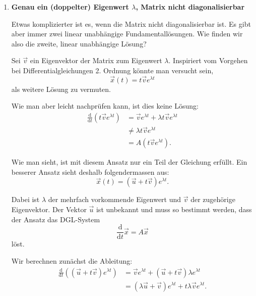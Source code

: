 \begin{enumerate}
\begin{enumerate}
              \item \textbf{Genau ein (doppelter) Eigenwert \(\lambda\),
                        Matrix nicht diagonalisierbar}

                    Etwas komplizierter ist es, wenn die Matrix nicht
                    diagonalisierbar ist. Es gibt aber immer zwei linear
                    unabhängige Fundamentallösungen. Wie finden wir also
                    die zweite, linear unabhängige Lösung?

                    Sei \(\vec{v}\) ein Eigenvektor der Matrix zum Eigenwert
                    \(\lambda\). Inspiriert vom Vorgehen bei
                    Differentialgleichungen 2. Ordnung könnte man versucht sein,
                    \[
                        \vec{x}(t)=t\vec{v}e^{\lambda t}
                    \]
                    als weitere Lösung zu vermuten.

                    Wie man aber leicht nachprüfen kann, ist dies keine Lösung:
                    \[
                        \begin{aligned}
                            \frac{\mathrm{d}}{\mathrm{d}t}
                            \left(t\vec{v}e^{\lambda t}\right)
                             & = \vec{v}e^{\lambda t}
                            +\lambda t\vec{v}e^{\lambda t}            \\
                             & \neq \lambda t\vec{v}e^{\lambda t}     \\
                             & = A\left(t\vec{v}e^{\lambda t}\right).
                        \end{aligned}
                    \]

                    Wie man sieht, ist mit diesem Ansatz nur ein Teil
                    der Gleichung erfüllt. Ein besserer Ansatz sieht deshalb
                    folgendermassen aus:
                    \[
                        \vec{x}(t)=(\vec{u}+t\vec{v})e^{\lambda t}.
                    \]

                    Dabei ist \(\lambda\) der mehrfach vorkommende Eigenwert
                    und \(\vec{v}\) der zugehörige Eigenvektor.
                    Der Vektor \(\vec{u}\) ist unbekannt und muss so bestimmt
                    werden, dass der Ansatz das DGL-System
                    \[
                        \frac{\mathrm{d}}{\mathrm{d}t}\vec{x}
                        = A\vec{x}
                    \]
                    löst.

                    Wir berechnen zunächst die Ableitung:
                    \[
                        \begin{aligned}
                            \frac{\mathrm{d}}{\mathrm{d}t}
                            \left((\vec{u}+t\vec{v})e^{\lambda t}\right)
                             & = \vec{v}e^{\lambda t}
                            +(\vec{u}+t\vec{v})\lambda e^{\lambda t}   \\
                             & = (\lambda\vec{u}+\vec{v})e^{\lambda t}
                            +t\lambda\vec{v}e^{\lambda t}.
                        \end{aligned}
                    \]


\end{enumerate}
\end{enumerate}
